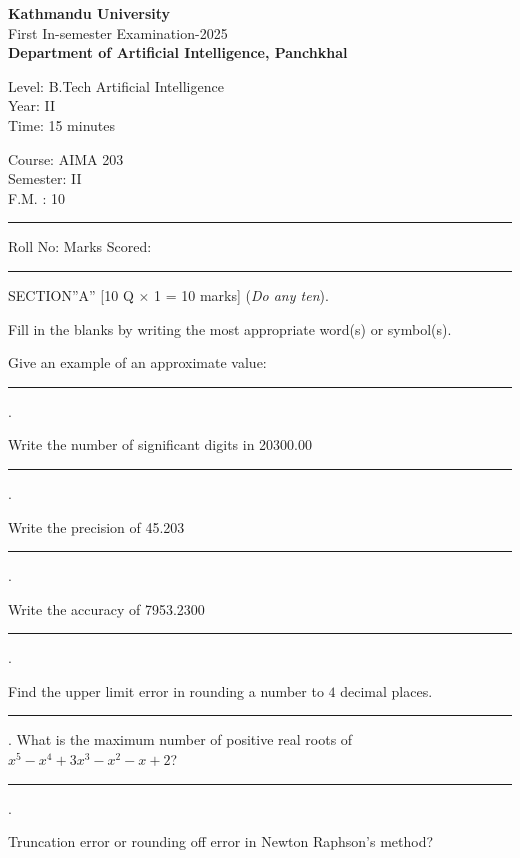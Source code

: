 \documentclass[12pt]{exam}
\begin{document}
\begin{center}
  {\bfseries  {\large Kathmandu University}} \\
  First In-semester Examination-2025 \\[-2mm]
    \textbf{\small Department of Artificial Intelligence, Panchkhal}
\end{center}
\vspace{2mm}

\begin{minipage}{0.70\linewidth}
  \begin{flushleft}
    Level: B.Tech Artificial Intelligence \\
    Year: II \\
    Time: 15 minutes
  \end{flushleft}
\end{minipage} \hfill
\begin{minipage}{0.25\linewidth}
  \begin{flushleft}
    Course: AIMA 203 \\
    Semester: II \\
    F.M. : 10
  \end{flushleft}
\end{minipage}
\vspace{-8mm}
\begin{center}
  \rule{\textwidth}{1pt}
  Roll No: \hspace{5.5cm} Marks Scored:
  \vskip -3mm
\rule{\textwidth}{1pt}
\end{center}



\begin{center}
  SECTION''A'' \hspace{5mm} [10 Q \(\times\) 1 = 10 marks] (\textit{Do any ten}).
\end{center}
Fill in the blanks by writing the most appropriate word(s) or symbol(s).
\begin{questions}
  \question Give an example of an approximate value: \rule{8cm}{0.15mm}.

  \question Write the number of significant digits in 20300.00  \rule{5cm}{0.15mm}.

  \question Write the precision of 45.203 \rule{5cm}{0.15mm}.

  \question Write the accuracy of 7953.2300 \rule{5cm}{0.15mm}.

  \question Find the upper limit error in rounding a number to $4$ decimal places.\rule{4cm}{0.15mm}.
    What is the maximum number of positive real roots of $x^5-x^4+3x^3-x^2-x+2$? \rule{7cm}{0.15mm}.

\question Truncation error or rounding off error in Newton Raphson's method?
\end{questions}
\end{document}
